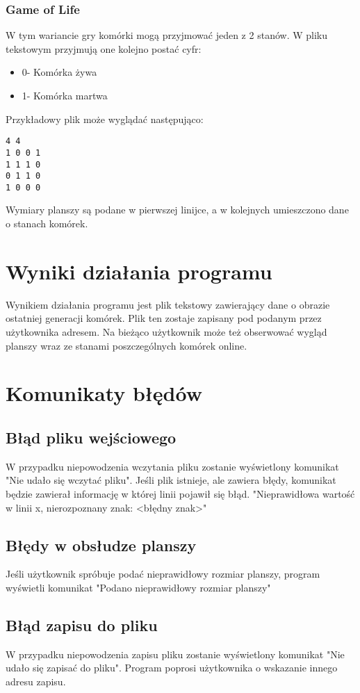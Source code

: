 \documentclass[10pt, oneside]{article}
\begin{document}
\subsubsection{Game of Life}
W tym wariancie gry komórki mogą przyjmować jeden z 2 stanów. W pliku tekstowym przyjmują one kolejno postać cyfr:
\begin{itemize}
\item 0- Komórka  żywa
\item 1- Komórka martwa
\end{itemize}
Przykładowy plik może wyglądać następująco:
\begin {verbatim}
4 4
1 0 0 1
1 1 1 0
0 1 1 0
1 0 0 0 
\end{verbatim}
Wymiary planszy są podane w pierwszej linijce, a w kolejnych umieszczono dane o stanach komórek.


\section{Wyniki działania programu}
Wynikiem działania programu jest plik tekstowy zawierający dane o obrazie ostatniej generacji komórek. Plik ten zostaje zapisany pod podanym przez użytkownika adresem.  Na bieżąco użytkownik może też obserwować wygląd planszy wraz ze stanami poszczególnych komórek online.

\section{Komunikaty błędów}
\subsection{Błąd pliku wejściowego}
W przypadku niepowodzenia wczytania pliku zostanie wyświetlony komunikat "Nie udało się wczytać pliku".
Jeśli plik istnieje, ale zawiera błędy, komunikat będzie zawierał informację w której linii pojawił się błąd. 
"Nieprawidłowa wartość w linii x, nierozpoznany znak: <błędny znak>"
\subsection{Błędy w obsłudze planszy}
 Jeśli użytkownik spróbuje podać nieprawidłowy rozmiar planszy, program wyświetli komunikat "Podano nieprawidłowy rozmiar planszy"
\subsection{Błąd zapisu do pliku}
W przypadku niepowodzenia zapisu pliku zostanie wyświetlony komunikat "Nie udało się zapisać do pliku". Program poprosi użytkownika o wskazanie innego adresu zapisu.
\end{document}
